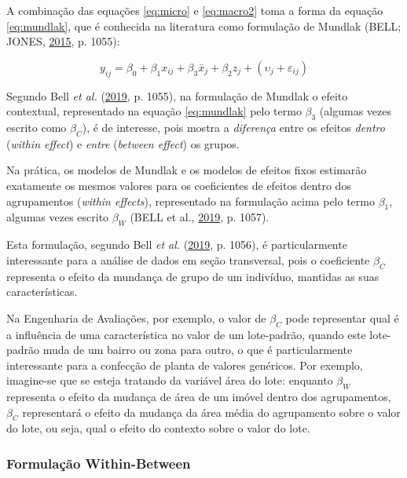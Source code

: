 \documentclass[
  a4paper, 11pt]{article}
\begin{document}
A combinação das equações \ref{eq:micro} e \ref{eq:macro2} toma a forma
da equação \ref{eq:mundlak}, que é conhecida na literatura como
formulação de Mundlak (BELL; JONES,
\protect\hyperlink{ref-bell2015}{2015}, p. 1055):

\begin{equation} \label{eq:mundlak}
y_{ij} = \beta_0 + \beta_{1} x_{ij} + \beta_{3}\bar{x}_j+ \beta_2 z_j + (\upsilon_j + \varepsilon_{ij}) 
\end{equation}

Segundo Bell \emph{et al.} (\protect\hyperlink{ref-bell2019}{2019}, p.
1055), na formulação de Mundlak o efeito contextual, representado na
equação \ref{eq:mundlak} pelo termo \(\beta_{3}\) (algumas vezes escrito
como \(\beta_{C}\)), é de interesse, pois mostra a \emph{diferença}
entre os efeitos \emph{dentro} (\emph{within effect}) e \emph{entre}
(\emph{between effect}) os grupos.

Na prática, os modelos de Mundlak e os modelos de efeitos fixos
estimarão exatamente os mesmos valores para os coeficientes de efeitos
dentro dos agrupamentos (\emph{within effects}), representado na
formulação acima pelo termo \(\beta_1\), algumas vezes escrito
\(\beta_{W}\) (BELL et al., \protect\hyperlink{ref-bell2019}{2019}, p.
1057).

Esta formulação, segundo Bell \emph{et al.}
(\protect\hyperlink{ref-bell2019}{2019}, p. 1056), é particularmente
interessante para a análise de dados em seção transversal, pois o
coeficiente \(\beta_C\) representa o efeito da mundança de grupo de um
indivíduo, mantidas as suas características.

Na Engenharia de Avaliações, por exemplo, o valor de \(\beta_C\) pode
representar qual é a influência de uma característica no valor de um
lote-padrão, quando este lote-padrão muda de um bairro ou zona para
outro, o que é particularmente interessante para a confecção de planta
de valores genéricos. Por exemplo, imagine-se que se esteja tratando da
variável área do lote: enquanto \(\beta_W\) representa o efeito da
mudança de área de um imóvel dentro dos agrupamentos, \(\beta_C\)
representará o efeito da mudança da área média do agrupamento sobre o
valor do lote, ou seja, qual o efeito do contexto sobre o valor do lote.

\hypertarget{formulauxe7uxe3o-within-between}{%
\subsubsection{Formulação
Within-Between}\label{formulauxe7uxe3o-within-between}}
\end{document}
